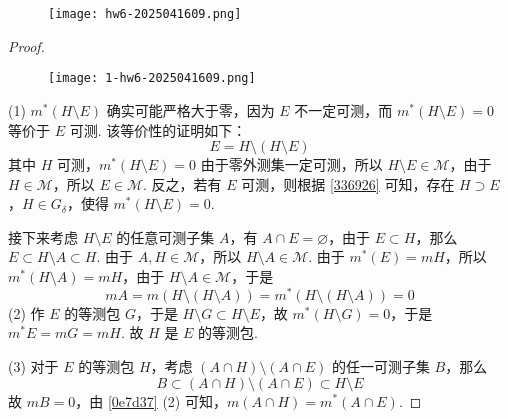 \begin{exercise}
\begin{figure}[H]
\centering
\texttt{[image: hw6-2025041609.png]}
\label{}
\end{figure}\label{0e7d37}
\end{exercise}

\begin{proof}

\begin{lemma}
\begin{figure}[H]
\centering
\texttt{[image: 1-hw6-2025041609.png]}
\label{}
\end{figure}
\end{lemma}
(1)
$m^{*}(H\setminus E)$ 确实可能严格大于零，因为 $E$ 不一定可测，而 $m^{*}(H\setminus E)=0$ 等价于 $E$ 可测. 该等价性的证明如下：
\[
E=H\setminus(H\setminus E)
\]
其中 $H$ 可测，$m^{*}(H\setminus E)=0$ 由于零外测集一定可测，所以 $H\setminus E\in \mathcal{M}$，由于 $H\in \mathcal{M}$，所以 $E\in \mathcal{M}$. 反之，若有 $E$ 可测，则根据 \cref{336926} 可知，存在 $H\supset E$，$H\in G_{\delta}$，使得 $m^{*}(H\setminus E)=0$.

接下来考虑 $H\setminus E$ 的任意可测子集 $A$，有 $A\cap E=\varnothing$，由于 $E\subset H$，那么 $E\subset H\setminus A\subset H$. 由于 $A, H\in \mathcal{M}$，所以 $H\setminus A\in \mathcal{M}$. 由于 $m^{*}(E)=mH$，所以 $m^{*}(H\setminus A)=mH$，由于 $H\setminus A\in \mathcal{M}$，于是
\[
mA=m(H\setminus(H\setminus A))=m^{*}(H\setminus(H\setminus A))=0
\]
(2) 作 $E$ 的等测包 $G$，于是 $H\setminus G\subset H\setminus E$，故 $m^{*}(H\setminus G)=0$，于是 $m^{*}E=mG=mH$. 故 $H$ 是 $E$ 的等测包.

(3) 对于 $E$ 的等测包 $H$，考虑 $(A\cap H)\setminus(A\cap E)$ 的任一可测子集 $B$，那么
\[
B\subset(A\cap H)\setminus(A\cap E)\subset H\setminus E
\]
故 $mB=0$，由 \cref{0e7d37}  (2) 可知，$m(A\cap H)=m^{*}(A\cap E)$.

\end{proof}

